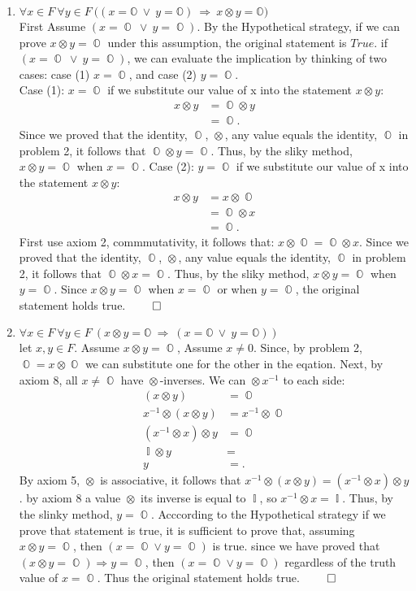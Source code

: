 \documentclass[11pt]{article}
\numberwithin{equation}{section}
\DeclareMathOperator*{\OO}{\mathbb{O}}
\DeclareMathOperator*{\I}{\mathbb{I}}
\DeclareMathOperator*{\+}{\oplus}
\DeclareMathOperator*{\x}{\otimes}
\begin{document}
\begin{enumerate}[label= 1.\arabic*), itemsep=0.4cm]
  \item %
    $\forall x \in F \ \forall y \in F \ \Big ( (x = \mathbb{O} \ \lor \ y = \mathbb{O})  \ \Rightarrow \ x \otimes y = \mathbb{O} \Big ) $\\
 First Assume $(x = \OO \ \lor \ y = \OO)$. By the Hypothetical strategy, if we can prove $x \x y = \OO$ under this assumption, the original statement is $True$. if $(x = \OO \ \lor \ y = \OO)$, we can evaluate the implication by thinking of two cases: case (1) $x = \OO$, and case (2) $y = \OO$.\\
 Case (1): $x = \OO$ if we substitute our value of x into the statement $x \x y$:
 \begin{align*}
   x \x y &= \OO \x y \\
          &= \OO.
 \end{align*}
Since we proved that the identity, $\OO$, $\x$, any value equals the identity, $\OO$ in problem 2, it follows that $\OO \x y = \OO$. Thus, by the sliky method, $x \x y = \OO$ when $x = \OO$.
Case (2): $y = \OO$ if we substitute our value of x into the statement $x \x y$:
 \begin{align*}
   x \x y &= x \x \OO \\
          &= \OO \x x \\
          &= \OO.
 \end{align*}
 First use axiom 2, commmutativity, it follows that: $x \x \OO = \OO \x x$. Since we proved that the identity, $\OO$, $\x$, any value equals the identity, $\OO$ in problem 2, it follows that $\OO \x x = \OO$. Thus, by the sliky method, $x \x y = \OO$ when $y = \OO$.
 Since $x \x y = \OO$ when $x = \OO$ or when $y = \OO$, the original statement holds true. $\qed$


 \item %
    $\forall x \in F \ \forall y \in F \ (x \otimes y = \mathbb{O}   \ \Rightarrow \ (x = \mathbb{O} \ \lor \ y = \mathbb{O}))$\\
  let $x,y \in F$. Assume $x \x y = \OO$, Assume $x \neq 0$. Since, by problem 2, $\OO = x \x \OO$ we can substitute one for the other in the eqation. Next, by axiom 8, all $x \neq \OO$ have $\x$-inverses. We can $\x x^{-1}$ to each side:
  \begin{align*}
    (x \x y) &= \OO\\
    x^{-1} \x (x \x y) &= x^{-1} \x \OO\\
    (x^{-1} \x x) \x y &= \OO \\
    \I \x y &= \\ 
    y &=. 
  \end{align*}
  By axiom 5, $\x$ is associative, it follows that $x^{-1} \x (x \x y) =  (x^{-1} \x x) \x y$. by axiom 8 a value $\x$ its inverse is equal to $\I$, so $x^{-1}\x x = \I$. Thus, by the slinky method, $y= \OO$. Acccording to the Hypothetical strategy if we prove that statement is true, it is sufficient to prove that, assuming $x \x y = \OO$, then $(x = \OO \lor y = \OO)$ is true. since we have proved that $(x \x y = \OO) \Rightarrow y = \OO$, then $(x = \OO \lor y = \OO)$ regardless of the truth value of $x = \OO$. Thus the original statement holds true. $\qed$


\end{enumerate}
\end{document}
